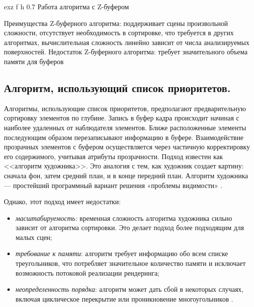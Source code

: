 	{exz} %
	{f} %
	{h} %
	{0.7\textwidth} %
	{Работа алгоритма с Z-буфером} %

Преимущества Z-буферного алгоритма: поддерживает сцены произвольной сложности,
отсутствует необходимость в сортировке, что требуется в других алгоритмах,
вычислительная сложность линейно зависит от числа анализируемых поверхностей. Недостаток Z-буферного алгоритма: требует значительного объема памяти для буферов~\cite{del_line}




\subsection{Алгоритм, использующий список приоритетов.}

Алгоритмы, использующие список приоритетов, предполагают предварительную сортировку элементов по глубине. Запись в буфер кадра происходит начиная с наиболее удаленных от наблюдателя элементов. Ближе расположенные элементы последующим образом перезаписывают информацию в буфере. Взаимодействие прозрачных элементов с буфером осуществляется через частичную корректировку его содержимого, учитывая атрибуты прозрачности. Подход известен как <<алгоритм художника>>. Это аналогия с тем, как художник создает картину: сначала фон, затем средний план, и в конце передний план. Алгоритм художника --- простейший программный вариант решения «проблемы видимости» \cite{light, del_line}. 

Однако, этот подход имеет недостатки:
\begin{itemize}
	\item \textit{масштабируемость:} временная сложность алгоритма художника сильно зависит от алгоритма сортировки. Это делает подход более подходящим для малых сцен;
	\item \textit{требование к памяти}: алгоритм требует информацию обо всем списке треугольников, что потребляет значительное количество памяти и исключает возможность потоковой реализации рендеринга;
	\item \textit{неопределенность порядка}: алгоритм может дать сбой в некоторых случаях, включая циклическое перекрытие или проникновение многоугольников \cite{light}.
\end{itemize}

